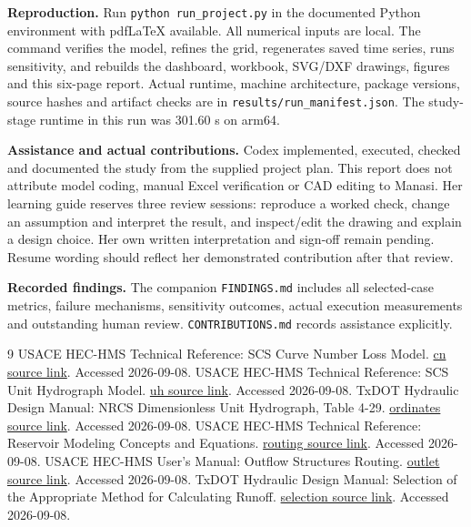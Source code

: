 \documentclass[10pt,letterpaper]{article}
\begin{document}
\textbf{Reproduction.} Run \texttt{python run\_project.py} in the documented Python environment with pdfLaTeX available. All numerical inputs are local. The command verifies the model, refines the grid, regenerates saved time series, runs sensitivity, and rebuilds the dashboard, workbook, SVG/DXF drawings, figures and this six-page report. Actual runtime, machine architecture, package versions, source hashes and artifact checks are in \texttt{results/run\_manifest.json}. The study-stage runtime in this run was 301.60 s on arm64.

\textbf{Assistance and actual contributions.} Codex implemented, executed, checked and documented the study from the supplied project plan. This report does not attribute model coding, manual Excel verification or CAD editing to Manasi. Her learning guide reserves three review sessions: reproduce a worked check, change an assumption and interpret the result, and inspect/edit the drawing and explain a design choice. Her own written interpretation and sign-off remain pending. Resume wording should reflect her demonstrated contribution after that review.

\textbf{Recorded findings.} The companion \texttt{FINDINGS.md} includes all selected-case metrics, failure mechanisms, sensitivity outcomes, actual execution measurements and outstanding human review. \texttt{CONTRIBUTIONS.md} records assistance explicitly.

{\footnotesize
\begin{thebibliography}{9}
USACE HEC-HMS Technical Reference: SCS Curve Number Loss Model. \href{https://www.hec.usace.army.mil/confluence/hmsdocs/hmstrm/canopy-surface-infiltration-and-runoff-volume/infiltration/scs-curve-number-loss-model}{cn source link}. Accessed 2026-09-08.
USACE HEC-HMS Technical Reference: SCS Unit Hydrograph Model. \href{https://www.hec.usace.army.mil/confluence/hmsdocs/hmstrm/transform/scs-unit-hydrograph-model}{uh source link}. Accessed 2026-09-08.
TxDOT Hydraulic Design Manual: NRCS Dimensionless Unit Hydrograph, Table 4-29. \href{https://www.txdot.gov/manuals/des/hyd/chapter-4--hydrology/section-13--hydrograph-method/nrcs-dimensionless-unit-hydrograph.html}{ordinates source link}. Accessed 2026-09-08.
USACE HEC-HMS Technical Reference: Reservoir Modeling Concepts and Equations. \href{https://www.hec.usace.army.mil/confluence/hmsdocs/hmstrm/reservoir-modeling/reservoir-modeling-concepts-and-equations}{routing source link}. Accessed 2026-09-08.
USACE HEC-HMS User's Manual: Outflow Structures Routing. \href{https://www.hec.usace.army.mil/confluence/hmsdocs/hmsum/latest/reservoir-elements/outflow-structures-routing}{outlet source link}. Accessed 2026-09-08.
TxDOT Hydraulic Design Manual: Selection of the Appropriate Method for Calculating Runoff. \href{https://www.txdot.gov/manuals/des/hyd/chapter-4--hydrology/section-7--selection-of-the-appropriate-method-for.html}{selection source link}. Accessed 2026-09-08.
\end{thebibliography}}
\end{document}
